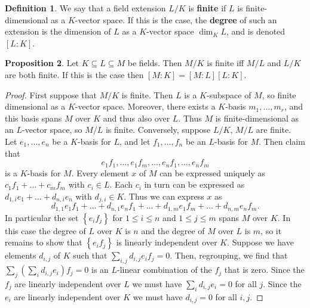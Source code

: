 \documentclass{article}
\newcommand{\rb}[1]{\left( #1 \right)}
\renewcommand{\sb}[1]{\left[ #1 \right]}
\newcommand{\cb}[1]{\left\{ #1 \right\}}
\theoremstyle{definition}\newtheorem{definition}{Definition}[section]
\theoremstyle{definition}\newtheorem{remark}[definition]{Remark}
\theoremstyle{definition}\newtheorem*{example}{Example}
\theoremstyle{definition}\newtheorem*{note}{Note}
\newtheorem{proposition}[definition]{Proposition}
\begin{document}
\begin{definition}
We say that a field extension $ L / K $ is \textbf{finite} if $ L $ is finite-dimensional as a $ K $-vector space. If this is the case, the \textbf{degree} of such an extension is the dimension of $ L $ as a $ K $-vector space $ \dim_KL $, and is denoted $ \sb{L : K} $.
\end{definition}

\begin{proposition}
Let $ K \subseteq L \subseteq M $ be fields. Then $ M / K $ is finite iff $ M / L $ and $ L / K $ are both finite. If this is the case then $ \sb{M : K} = \sb{M : L}\sb{L : K} $.
\end{proposition}

\begin{proof}
First suppose that $ M / K $ is finite. Then $ L $ is a $ K $-subspace of $ M $, so finite dimensional as a $ K $-vector space. Moreover, there exists a $ K $-basis $ m_1, \dots, m_r $, and this basis spans $ M $ over $ K $ and thus also over $ L $. Thus $ M $ is finite-dimensional as an $ L $-vector space, so $ M / L $ is finite. Conversely, suppose $ L / K $, $ M / L $ are finite. Let $ e_1, \dots, e_n $ be a $ K $-basis for $ L $, and let $ f_1, \dots, f_n $ be an $ L $-basis for $ M $. Then claim that
$$ e_1f_1, \dots, e_1f_m, \dots, e_nf_1, \dots, e_nf_m $$
is a $ K $-basis for $ M $. Every element $ x $ of $ M $ can be expressed uniquely as $ c_1f_1 + \dots + c_mf_m $ with $ c_i \in L $. Each $ c_i $ in turn can be expressed as $ d_{1, i}e_1 + \dots + d_{n, i}e_n $ with $ d_{j, i} \in K $. Thus we can express $ x $ as
$$ d_{1, 1}e_1f_1 + \dots + d_{n, 1}e_nf_1 + \dots + d_{1, m}e_1f_m + \dots + d_{n, m}e_nf_m. $$
In particular the set $ \cb{e_if_j} $ for $ 1 \le i \le n $ and $ 1 \le j \le m $ spans $ M $ over $ K $. In this case the degree of $ L $ over $ K $ is $ n $ and the degree of $ M $ over $ L $ is $ m $, so it remains to show that $ \cb{e_if_j} $ is linearly independent over $ K $. Suppose we have elements $ d_{i, j} $ of $ K $ such that $ \sum_{i, j} d_{i, j}e_if_j = 0 $. Then, regrouping, we find that $ \sum_j \rb{\sum_i d_{i, j}e_i}f_j = 0 $ is an $ L $-linear combination of the $ f_j $ that is zero. Since the $ f_j $ are linearly independent over $ L $ we must have $ \sum_i d_{i, j}e_i = 0 $ for all $ j $. Since the $ e_i $ are linearly independent over $ K $ we must have $ d_{i, j} = 0 $ for all $ i, j $.
\end{proof}
\end{document}
